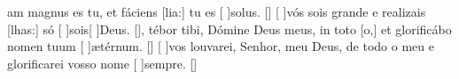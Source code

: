 {%
{am magnus es tu, et fáciens [lia:] tu es [ ]{so}lus. [\LinkLA]}%
  {[ ]{vós} sois grande e realizais [lhas:] só [ ]{sois}[ ]{Deus}. [\LinkPT]},
{tébor tibi, Dómine Deus meus, in toto [o,] et glorificábo nomen tuum [ ]{æ}{tér}num. [\LinkLA]}%
  {[ ]{vos} louvarei, Senhor, meu Deus, de todo o meu  e glorificarei vosso nome [ ]{sem}pre. [\LinkPT]}
}